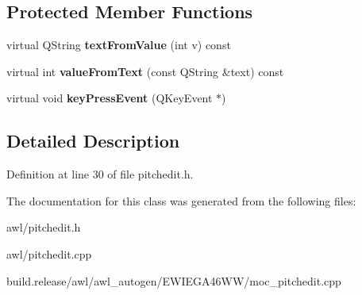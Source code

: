 \subsection*{Protected Member Functions}
\begin{DoxyCompactItemize}
\item 
\mbox{\label{class_awl_1_1_pitch_edit_aaf0fe25e6663115017a7dea189ed6916}} 
virtual Q\+String {\bfseries text\+From\+Value} (int v) const
\item 
\mbox{\label{class_awl_1_1_pitch_edit_a5f7423a5c3b28c68344d9e40f07a0dfc}} 
virtual int {\bfseries value\+From\+Text} (const Q\+String \&text) const
\item 
\mbox{\label{class_awl_1_1_pitch_edit_a187567af56e88cd69e3d4dc3c40488ff}} 
virtual void {\bfseries key\+Press\+Event} (Q\+Key\+Event $\ast$)
\end{DoxyCompactItemize}


\subsection{Detailed Description}


Definition at line 30 of file pitchedit.\+h.



The documentation for this class was generated from the following files\+:\begin{DoxyCompactItemize}
\item 
awl/pitchedit.\+h\item 
awl/pitchedit.\+cpp\item 
build.\+release/awl/awl\+\_\+autogen/\+E\+W\+I\+E\+G\+A46\+W\+W/moc\+\_\+pitchedit.\+cpp\end{DoxyCompactItemize}
